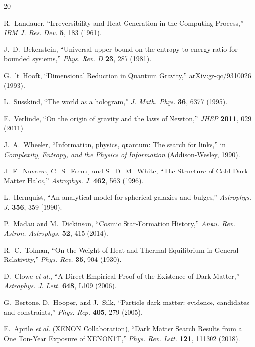 \documentclass[12pt,a4paper]{article}
\begin{document}
\begin{thebibliography}{20}

R.~Landauer, ``Irreversibility and Heat Generation in the Computing Process,'' \emph{IBM J. Res. Dev.} \textbf{5}, 183 (1961).

J.~D.~Bekenstein, ``Universal upper bound on the entropy-to-energy ratio for bounded systems,'' \emph{Phys. Rev. D} \textbf{23}, 287 (1981).

G.~'t~Hooft, ``Dimensional Reduction in Quantum Gravity,'' arXiv:gr-qc/9310026 (1993).

L.~Susskind, ``The world as a hologram,'' \emph{J. Math. Phys.} \textbf{36}, 6377 (1995).

E.~Verlinde, ``On the origin of gravity and the laws of Newton,'' \emph{JHEP} \textbf{2011}, 029 (2011).

J.~A.~Wheeler, ``Information, physics, quantum: The search for links,'' in \emph{Complexity, Entropy, and the Physics of Information} (Addison-Wesley, 1990).

J.~F.~Navarro, C.~S.~Frenk, and S.~D.~M.~White, ``The Structure of Cold Dark Matter Halos,'' \emph{Astrophys. J.} \textbf{462}, 563 (1996).

L.~Hernquist, ``An analytical model for spherical galaxies and bulges,'' \emph{Astrophys. J.} \textbf{356}, 359 (1990).

P.~Madau and M.~Dickinson, ``Cosmic Star-Formation History,'' \emph{Annu. Rev. Astron. Astrophys.} \textbf{52}, 415 (2014).

R.~C.~Tolman, ``On the Weight of Heat and Thermal Equilibrium in General Relativity,'' \emph{Phys. Rev.} \textbf{35}, 904 (1930).

D.~Clowe \emph{et al.}, ``A Direct Empirical Proof of the Existence of Dark Matter,'' \emph{Astrophys. J. Lett.} \textbf{648}, L109 (2006).

G.~Bertone, D.~Hooper, and J.~Silk, ``Particle dark matter: evidence, candidates and constraints,'' \emph{Phys. Rep.} \textbf{405}, 279 (2005).

E.~Aprile \emph{et al.} (XENON Collaboration), ``Dark Matter Search Results from a One Ton-Year Exposure of XENON1T,'' \emph{Phys. Rev. Lett.} \textbf{121}, 111302 (2018).


\end{thebibliography}
\end{document}
